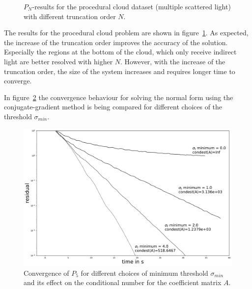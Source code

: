 \begin{figure}[h]
\caption{$P_N$-results for the procedural cloud dataset (multiple scattered light) with different truncation order $N$.}
\label{fig:pn_results_nebulae1}
\end{figure}

The results for the procedural cloud problem are shown in figure~\ref{fig:pn_results_nebulae1}. As expected, the increase of the truncation order improves the accuracy of the solution. Especially the regions at the bottom of the cloud, which only receive indirect light are better resolved with higher $N$. However, with the increase of the truncation order, the size of the system increases and requires longer time to converge.

In figure~\ref{fig:pn_results_convergence} the convergence behaviour for solving the normal form using the conjugate-gradient method is being compared for different choices of the threshold $\sigma_{min}$.
\begin{figure}[h]
\centering
\includegraphics[width=\columnwidth]{04_pn_method/results/fig_nebulae_p1_convergence.pdf}
\caption{Convergence of $P_5$ for different choices of minimum threshold $\sigma_{min}$ and its effect on the conditional number for the coefficient matrix $A$.}
\label{fig:pn_results_convergence}
\end{figure}




